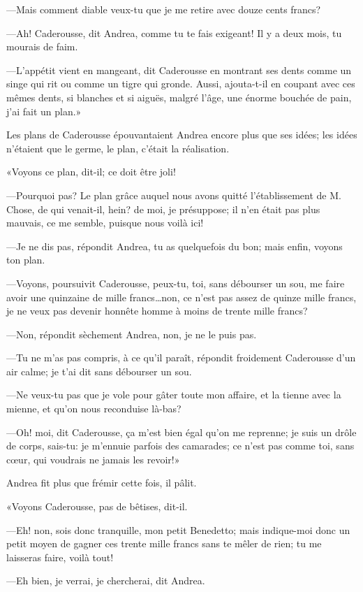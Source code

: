 —Mais comment diable veux-tu que je me retire avec douze cents francs? 

—Ah! Caderousse, dit Andrea, comme tu te fais exigeant! Il y a deux mois, tu mourais de faim. 

—L'appétit vient en mangeant, dit Caderousse en montrant ses dents comme un singe qui rit ou comme un tigre qui gronde. Aussi, ajouta-t-il en coupant avec ces mêmes dents, si blanches et si aiguës, malgré l'âge, une énorme bouchée de pain, j'ai fait un plan.» 

Les plans de Caderousse épouvantaient Andrea encore plus que ses idées; les idées n'étaient que le germe, le plan, c'était la réalisation. 

«Voyons ce plan, dit-il; ce doit être joli! 

—Pourquoi pas? Le plan grâce auquel nous avons quitté l'établissement de M. Chose, de qui venait-il, hein? de moi, je présuppose; il n'en était pas plus mauvais, ce me semble, puisque nous voilà ici! 

—Je ne dis pas, répondit Andrea, tu as quelquefois du bon; mais enfin, voyons ton plan. 

—Voyons, poursuivit Caderousse, peux-tu, toi, sans débourser un sou, me faire avoir une quinzaine de mille francs\dots non, ce n'est pas assez de quinze mille francs, je ne veux pas devenir honnête homme à moins de trente mille francs? 

—Non, répondit sèchement Andrea, non, je ne le puis pas. 

—Tu ne m'as pas compris, à ce qu'il paraît, répondit froidement Caderousse d'un air calme; je t'ai dit sans débourser un sou. 

—Ne veux-tu pas que je vole pour gâter toute mon affaire, et la tienne avec la mienne, et qu'on nous reconduise là-bas? 

—Oh! moi, dit Caderousse, ça m'est bien égal qu'on me reprenne; je suis un drôle de corps, sais-tu: je m'ennuie parfois des camarades; ce n'est pas comme toi, sans cœur, qui voudrais ne jamais les revoir!» 

Andrea fit plus que frémir cette fois, il pâlit. 

«Voyons Caderousse, pas de bêtises, dit-il. 

—Eh! non, sois donc tranquille, mon petit Benedetto; mais indique-moi donc un petit moyen de gagner ces trente mille francs sans te mêler de rien; tu me laisseras faire, voilà tout! 

—Eh bien, je verrai, je chercherai, dit Andrea. 

